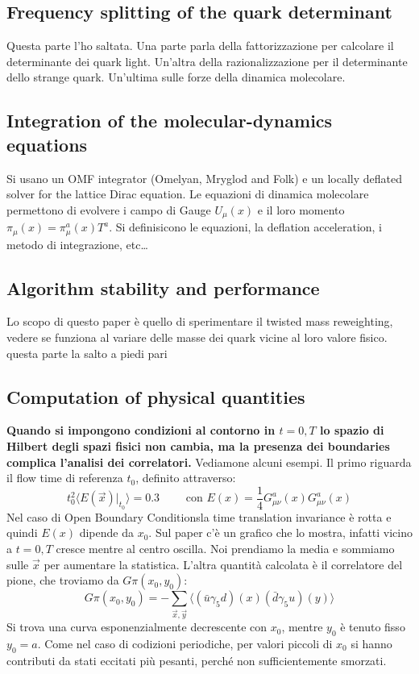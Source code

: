 \documentclass[12pt,a4paper,openright]{article}
\newcommand{\la}{\langle}
\newcommand{\ra}{\rangle}
\newcommand{\colg}{\textcolor{PineGreen}}
\newcommand{\colr}{\textcolor{BrickRed}}
\newcommand{\obc}{Open Boundary Conditions}
\begin{document}
\subsection{Frequency splitting of the quark determinant}
Questa parte l'ho saltata. Una parte parla della fattorizzazione per calcolare il determinante dei quark light.
Un'altra della razionalizzazione per il determinante dello strange quark. Un'ultima sulle forze della dinamica molecolare.

\subsection{Integration of the molecular-dynamics equations}
Si usano un OMF integrator (Omelyan, Mryglod and Folk) e un locally deflated solver for the lattice Dirac equation.
Le equazioni di dinamica molecolare permettono di evolvere i campo di Gauge $U_\mu (x)$ e il loro momento $\pi_\mu (x) = \pi_\mu^a (x) T^a$.
Si definisicono le equazioni, la deflation acceleration, i metodo di integrazione, etc\dots

\subsection{Algorithm stability and performance}
Lo scopo di questo paper è quello di \colg{sperimentare il twisted mass reweighting, vedere se funziona al variare delle masse dei quark vicine al loro valore fisico}.
\newline
\colr{questa parte la salto a piedi pari}

\subsection{Computation of physical quantities}
\colg{\bf Quando si impongono condizioni al contorno in $t = 0,T$ lo spazio di Hilbert degli spazi fisici non cambia, ma la presenza dei boundaries complica l'analisi dei correlatori.}
Vediamone alcuni esempi.
\newline
Il primo riguarda il flow time di referenza $t_0$, definito attraverso:
\begin{equation*}
  t_0^2 \la E(\vec x)|_{t_0} \ra = 0.3 \qquad \text{ con } E(x) = \frac{1}{4} G_{\mu\nu}^a (x) G_{\mu\nu}^a (x)
\end{equation*}
Nel caso di \obc la time translation invariance è rotta e quindi $E(x)$ dipende da $x_0$.
Sul paper c'è un grafico che lo mostra, infatti vicino a $t = 0,T$ cresce mentre al centro oscilla. Noi prendiamo la media e sommiamo sulle $\vec x$ per aumentare la statistica.
\newline
L'altra quantità calcolata è il correlatore del pione, che troviamo da $G\pi (x_0,y_0)$:
\begin{equation*}
  G\pi (x_0,y_0) = - \sum_{\vec x, \vec y} \la (\bar u \gamma_5 d)(x) (\bar d \gamma_5 u)(y) \ra 
\end{equation*}
Si trova una curva esponenzialmente decrescente con $x_0$, mentre $y_0$ è tenuto fisso $y_0 = a$. Come nel caso di codizioni periodiche, per valori piccoli di $x_0$ si hanno contributi da stati eccitati più pesanti, perché non sufficientemente smorzati.
\end{document}
